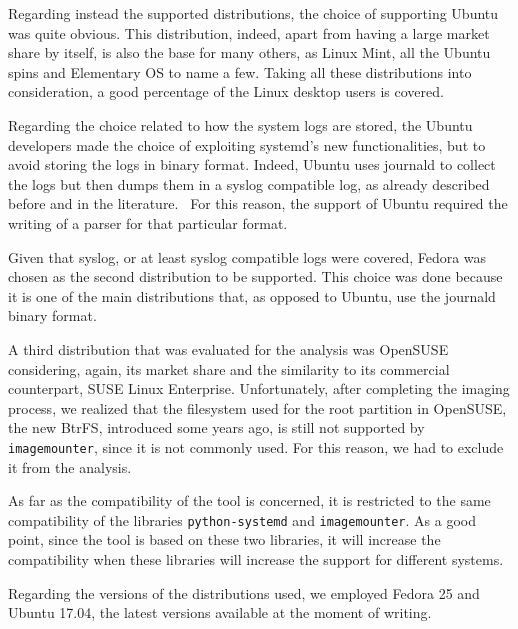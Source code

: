 \documentclass[a4paper]{article}
\begin{document}
Regarding instead the supported distributions, the choice of supporting Ubuntu
was quite obvious. This distribution, indeed, apart from having a large market
share by itself, is also the base for many others, as Linux Mint, all the Ubuntu
spins and Elementary OS to name a few. Taking all these distributions into
consideration, a good percentage of the Linux desktop users is covered.

Regarding the choice related to how the system logs are stored, the Ubuntu
developers made the choice of exploiting systemd's new functionalities, but to
avoid storing the logs in binary format. Indeed, Ubuntu uses journald to collect
the logs but then dumps them in a syslog compatible log, as already described
before and in the literature.~\cite{patil2016digital} For this reason, the
support of Ubuntu required the writing of a parser for that particular format.

Given that syslog, or at least syslog compatible logs were covered, Fedora was
chosen as the second distribution to be supported. This choice was done because
it is one of the main distributions that, as opposed to Ubuntu, use the
journald binary format.

A third distribution that was evaluated for the analysis was OpenSUSE
considering, again, its market share and the similarity to its commercial
counterpart, SUSE Linux Enterprise. Unfortunately, after completing the imaging
process, we realized that the filesystem used for the root partition in
OpenSUSE, the new BtrFS, introduced some years ago, is still not supported by
\texttt{imagemounter}, since it is not commonly used. For this reason, we had to
exclude it from the analysis.

As far as the compatibility of the tool is concerned, it is restricted to the
same compatibility of the libraries \texttt{python-systemd} and
\texttt{imagemounter}. As a good point, since the tool is based on these two
libraries, it will increase the compatibility when these libraries will increase
the support for different systems.

Regarding the versions of the distributions used, we employed Fedora 25 and
Ubuntu 17.04, the latest versions available at the moment of writing.
\end{document}
